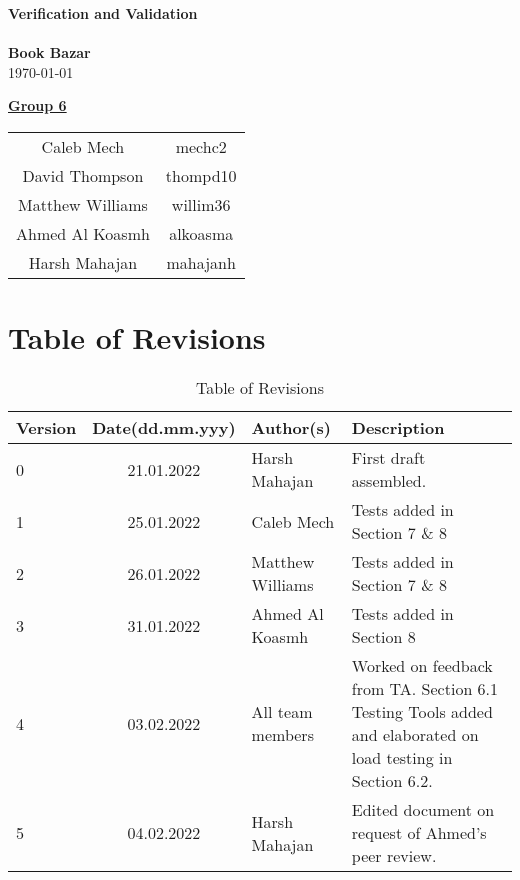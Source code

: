 \documentclass[fullpage]{article}
\begin{document}
\vspace*{\fill}
\begin{center}

  {\Huge \textbf{Verification and Validation}}\\
\hrulefill\\[2mm]
  {\huge \textbf{Book Bazar}}\\[2mm]
{\large \today}\\[15mm]
{\large
\underline{\textbf{Group 6}}\\
\begin{tabular}{ c c }

 Caleb Mech & mechc2\\ 
 David Thompson & thompd10\\
 Matthew Williams & willim36\\
 Ahmed Al Koasmh & alkoasma\\
 Harsh Mahajan	& mahajanh    
\end{tabular}
}

\end{center}

\vspace*{\fill}

\newpage
\begingroup
\hypersetup{hidelinks}
\tableofcontents

\listoffigures
\listoftables
\endgroup
\newpage

\section{Table of Revisions}
\begin{table}[h]
\centering
\begin{tabular}{| l | c | p{4cm}| p{5cm}|}
\hline
 \rowcolor{lightgray} 
\textbf{Version} & \textbf{Date(dd.mm.yyy)} &\textbf{Author(s)} &\textbf{Description}\\
\hline
0 & 21.01.2022 & Harsh Mahajan & First draft assembled.\\
\hline
1 & 25.01.2022 & Caleb Mech & Tests added in Section 7 \& 8\\
\hline
2 & 26.01.2022 & Matthew Williams & Tests added in Section 7 \& 8\\
\hline
3 & 31.01.2022 & Ahmed Al Koasmh & Tests added in Section 8\\
\hline
4& 03.02.2022& All team members & Worked on feedback from TA. Section 6.1 Testing Tools added and elaborated on load testing in Section 6.2.\\
\hline
5& 04.02.2022& Harsh Mahajan & Edited document on request of Ahmed's peer review.\\
\hline
\end{tabular}
\caption{Table of Revisions}

\end{table}
\end{document}
